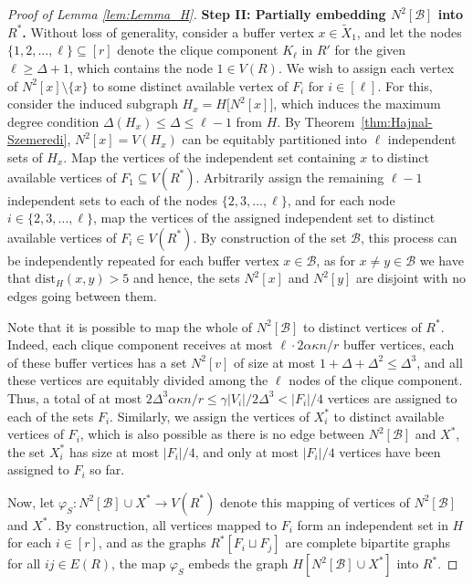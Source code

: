 \documentclass[final]{article}
\theoremstyle{definition}
\newcommand{\dist}{\mathrm{dist}}
\let\tilde\widetilde
\begin{document}
\begin{proof}[Proof of Lemma \ref{lem:Lemma_H}]
    \textbf{Step II: Partially embedding $N^2[\mathcal{B}]$ into $R^*$.} Without loss of generality, consider a buffer vertex $x \in \tilde{X}_1$, and let the nodes $\{1, 2, \dots, \ell\} \subseteq [r]$ denote the clique component $K_{\ell}$ in $R'$ for the given $\ell \geq \Delta+1$, which contains the node $1 \in V(R)$. We wish to assign each vertex of $N^2[x] \setminus\{x\}$ to some distinct available vertex of $F_i$ for $i \in [\ell]$. For this, consider the induced subgraph $H_x = H\bigl[N^2[x]\bigr]$, which induces the maximum degree condition $\Delta(H_x) \leq \Delta \leq \ell-1$ from $H$. By Theorem~\ref{thm:Hajnal-Szemeredi}, $N^2[x] = V(H_x)$ can be equitably partitioned into $\ell$ independent sets of $H_x$. Map the vertices of the independent set containing $x$ to distinct available vertices of $F_1 \subseteq V(R^*)$. Arbitrarily assign the remaining $\ell-1$ independent sets to each of the nodes $\{2, 3, \dots, \ell\}$, and for each node $i \in \{2, 3, \dots, \ell\}$, map the vertices of the assigned independent set to distinct available vertices of $F_i \in V(R^*)$. By construction of the set $\mathcal{B}$, this process can be independently repeated for each buffer vertex $x \in \mathcal{B}$, as for $x \neq y \in \mathcal{B}$ we have that $\dist_H(x,y) > 5$ and hence, the sets $N^2[x]$ and $N^2[y]$ are disjoint with no edges going between them. 
    
    Note that it is possible to map the whole of $N^2[\mathcal{B}]$ to distinct vertices of $R^*$. Indeed, each clique component receives at most $\ell\cdot 2\alpha \kappa n/r$ buffer vertices, each of these buffer vertices has a set $N^2[v]$ of size at most $1 + \Delta + \Delta^2 \leq \Delta^3$, and all these vertices are equitably divided among the $\ell$ nodes of the clique component. Thus, a total of at most $2\Delta^3\alpha \kappa n/r \leq \gamma|V_i|/2\Delta^3 < |F_i|/4$ vertices are assigned to each of the sets $F_i$. Similarly, we assign the vertices of $X_i^*$ to distinct available vertices of $F_i$, which is also possible as there is no edge between $N^2[\mathcal{B}]$ and $X^*$, the set $X_i^*$ has size at most $|F_i|/4$, and only at most $|F_i|/4$ vertices have been assigned to $F_i$ so far. 
    
    Now, let $\varphi_S : N^{2}[\mathcal{B}] \cup X^* \to V(R^*)$ denote this mapping of vertices of $N^2[\mathcal{B}]$ and $X^*$. By construction, all vertices mapped to $F_i$ form an independent set in $H$ for each $i \in [r]$, and as the graphs $R^*[F_i \sqcup F_j]$ are complete bipartite graphs for all $ij \in E(R)$, the map $\varphi_S$ embeds the graph $H[N^2[\mathcal{B}]\cup X^*]$ into $R^*$.  


\end{proof}
\end{document}
